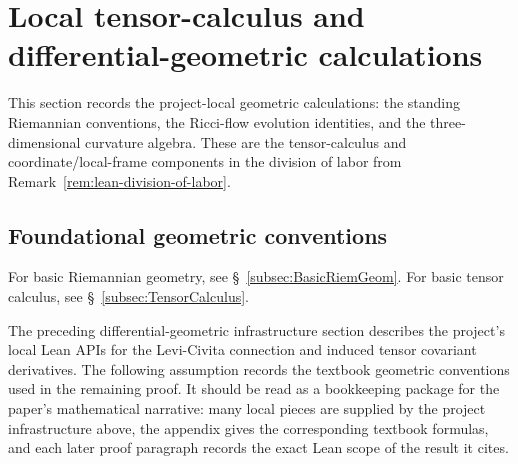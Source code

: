 \documentclass[11pt]{article}
\theoremstyle{plain}
\theoremstyle{definition}
\theoremstyle{remark}
\begin{document}
\section{Local tensor-calculus and differential-geometric calculations}
\label{sec:local-tensor-geometry}

This section records the project-local geometric calculations: the standing
Riemannian conventions, the Ricci-flow evolution identities, and the
three-dimensional curvature algebra.  These are the tensor-calculus and
coordinate/local-frame components in the division of labor from
Remark~\ref{rem:lean-division-of-labor}.

\subsection{Foundational geometric conventions}

For basic Riemannian geometry, see \S~\ref{subsec:BasicRiemGeom}.  For basic
tensor calculus, see \S~\ref{subsec:TensorCalculus}.

The preceding differential-geometric infrastructure section describes the
project's local Lean APIs for the Levi-Civita connection and induced tensor
covariant derivatives.  The following assumption records the textbook geometric
conventions used in the remaining proof.  It should be read as a bookkeeping
package for the paper's mathematical narrative: many local pieces are supplied
by the project infrastructure above, the appendix gives the corresponding
textbook formulas, and each later proof paragraph records the exact Lean scope
of the result it cites.
\end{document}
